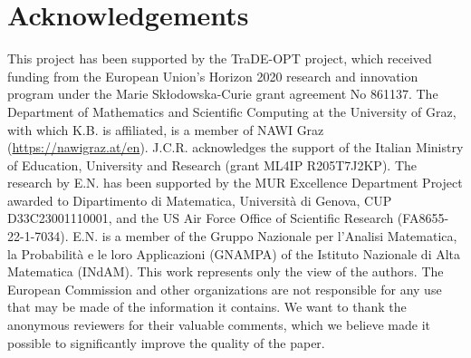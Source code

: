 \documentclass[onefignum,onetabnum]{siamonline250211}
\begin{document}
\section{Acknowledgements}
This project has been supported by the TraDE-OPT project, which received funding from the European Union’s Horizon 2020 research and innovation program under the Marie Skłodowska-Curie grant agreement No 861137. The Department of Mathematics and Scientific Computing at the University of Graz, with which K.B. is affiliated, is a member of NAWI Graz (\url{https://nawigraz.at/en}). J.C.R. acknowledges the support of the Italian Ministry of Education, University and Research (grant ML4IP R205T7J2KP). The research by E.N. has been supported by the MUR Excellence Department Project awarded to Dipartimento di Matematica, Università di Genova, CUP D33C23001110001, and the US Air Force Office of Scientific Research (FA8655-22-1-7034). E.N. is a member of the Gruppo Nazionale per l’Analisi Matematica, la Probabilità e le loro Applicazioni (GNAMPA) of the Istituto Nazionale di Alta Matematica (INdAM). This work represents only the view of the authors. The European Commission and other organizations are not responsible for any use that may be made of the information it contains. We want to thank the anonymous reviewers for their valuable comments, which we believe made it possible to significantly improve the quality of the paper.



\end{document}

